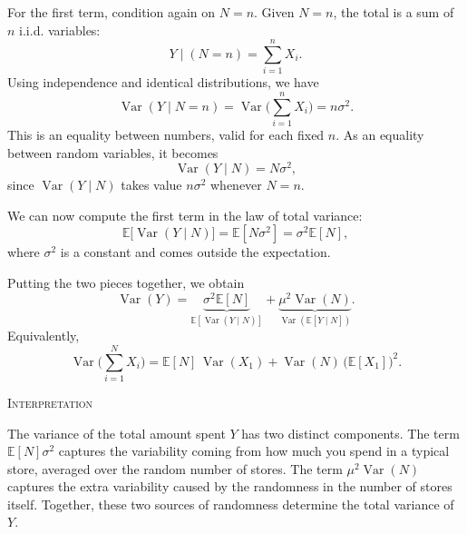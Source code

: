 For the first term, condition again on \(N = n\).  
Given \(N = n\), the total is a sum of \(n\) i.i.d. variables:
\[
Y \mid (N = n)
=
\sum_{i=1}^{n} X_i.
\]
Using independence and identical distributions, we have
\[
\operatorname{Var}(Y \mid N = n)
=
\operatorname{Var}\Big(\sum_{i=1}^{n} X_i\Big)
=
n \sigma^{2}.
\]
This is an equality between numbers, valid for each fixed \(n\).  
As an equality between random variables, it becomes
\[
\operatorname{Var}(Y \mid N)
=
N \sigma^{2},
\]
since \(\operatorname{Var}(Y \mid N)\) takes value \(n \sigma^{2}\) whenever \(N = n\).

We can now compute the first term in the law of total variance:
\[
\mathbb{E}\big[\operatorname{Var}(Y \mid N)\big]
=
\mathbb{E}[N \sigma^{2}]
=
\sigma^{2}\mathbb{E}[N],
\]
where \(\sigma^{2}\) is a constant and comes outside the expectation.

Putting the two pieces together, we obtain
\[
\operatorname{Var}(Y)
=
\underbrace{\sigma^{2}\mathbb{E}[N]}_{\mathbb{E}[\operatorname{Var}(Y \mid N)]}
+
\underbrace{\mu^{2}\operatorname{Var}(N)}_{\operatorname{Var}(\mathbb{E}[Y \mid N])}.
\]
Equivalently,
\[
\operatorname{Var}\Big(\sum_{i=1}^{N} X_i\Big)
=
\mathbb{E}[N]\,\operatorname{Var}(X_1)
+
\operatorname{Var}(N)\,\big(\mathbb{E}[X_1]\big)^{2}.
\]

\bigskip
\textsc{Interpretation}

The variance of the total amount spent \(Y\) has two distinct components.  
The term \(\mathbb{E}[N]\sigma^{2}\) captures the variability coming from how much you spend in a typical store, averaged over the random number of stores.  
The term \(\mu^{2}\operatorname{Var}(N)\) captures the extra variability caused by the randomness in the number of stores itself.  
Together, these two sources of randomness determine the total variance of \(Y\).
